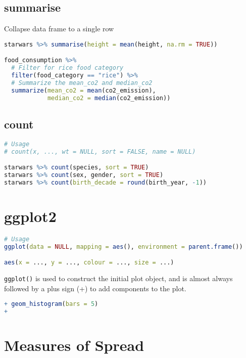 \documentclass[11pt]{article}
\begin{document}
\subsection{summarise}

Collapse data frame to a single row

\begin{lstlisting}[language=R]
starwars %>% summarise(height = mean(height, na.rm = TRUE))

food_consumption %>%
  # Filter for rice food category
  filter(food_category == "rice") %>%
  # Summarize the mean_co2 and median_co2
  summarize(mean_co2 = mean(co2_emission),
            median_co2 = median(co2_emission))
\end{lstlisting}

\subsection{count}

\begin{lstlisting}[language=R]
# Usage
# count(x, ..., wt = NULL, sort = FALSE, name = NULL)

starwars %>% count(species, sort = TRUE)
starwars %>% count(sex, gender, sort = TRUE)
starwars %>% count(birth_decade = round(birth_year, -1))
\end{lstlisting}

\newpage
\section{ggplot2}
\begin{lstlisting}[language=R]
# Usage
ggplot(data = NULL, mapping = aes(), environment = parent.frame())

aes(x = ..., y = ..., colour = ..., size = ...)
\end{lstlisting}

\lstinline|ggplot()| is used to construct the initial plot object, and is almost always followed by a plus sign (+) to add components to the plot.

\begin{lstlisting}[language=R]
+ geom_histogram(bars = 5)
+ 
\end{lstlisting}

\newpage
\section{Measures of Spread}
\end{document}
